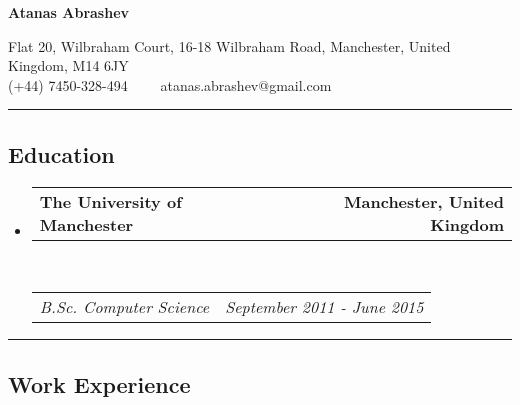 \documentclass[10pt,letterpaper]{article}
\makeatletter
\newcommand{\headerrow}[2]
{\begin{tabular*}{\linewidth}{l@{\extracolsep{\fill}}r}
    #1 &
    #2 \\
\end{tabular*}}
\makeatother
\begin{document}
\begin{center}
{\LARGE \textbf{Atanas Abrashev}}

Flat 20, Wilbraham Court,
16-18 Wilbraham Road,
Manchester, United Kingdom,
M14 6JY
\\
(+44) 7450-328-494\ \ \textbullet
\ \ atanas.abrashev@gmail.com
\end{center}

\hrule
\vspace{-0.4em}
\subsection*{Education}

\begin{itemize}
    \parskip=0.1em

    \item
    \headerrow
        {\textbf{The University of Manchester}}
        {\textbf{Manchester, United Kingdom}}
    \\
    \headerrow
        {\emph{B.Sc. Computer Science}}
        {\emph{September 2011 - June 2015}}
\end{itemize}

\hrule
\vspace{-0.4em}
\subsection*{Work Experience}
\end{document}
